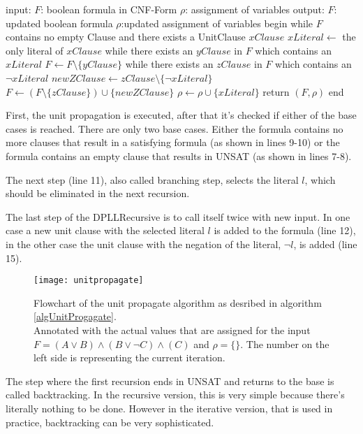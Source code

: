 \begin{algorithm}[caption={UnitPropagate}, label={algUnitProgagate}]
 input: $F$: boolean formula in CNF-Form
	$\rho$: assignment of variables
 output: $F$: updated boolean formula
	$\rho$:updated assignment of variables
 begin
   while $F$ contains no empty Clause
   and there exists a UnitClause $xClause$
       $xLiteral \gets$ the only literal of $xClause$
       while there exists an $yClause$ in $F$
       which contains an $xLiteral$
           $F \gets F \setminus \{yClause\}$     
       while there exists an $zClause$ in $F$
       which contains an $\lnot xLiteral$
           $newZClause \gets zClause \setminus \{\lnot xLiteral\}$
           $F \gets (F \setminus \{zClause\}) \cup \{newZClause\}$
       $\rho \gets \rho \cup \{xLiteral\}$
   return $(F, \rho)$
 end
\end{algorithm}


First, the unit propagation is executed, after that it's checked if either of the base cases is reached. 
There are only two base cases. Either the formula contains no more clauses that result in a satisfying formula (as shown in lines 9-10) or the formula contains an empty clause that results in UNSAT (as shown in lines 7-8).

The next step (line 11), also called branching step, selects the literal $l$, which should be eliminated in the next recursion.

The last step of the DPLLRecursive is to call itself twice with new input. In one case a new unit clause with the selected literal $l$ is added to the formula (line 12), in the other case the unit clause with the negation of the literal, $\lnot l$, is added (line 15).

\begin{figure}
\texttt{[image: unitpropagate]}
\centering
\caption{Flowchart of the unit propagate algorithm as desribed in algorithm \ref{algUnitProgagate}.\\ Annotated with the actual values that are assigned for the input $F=(A \lor B ) \land (B \lor \lnot C) \land (C)$ and $\rho = \{\}$. The number on the left side is representing the current iteration.}
\label{fig:unitpropagate}
\end{figure}

The step where the first recursion ends in UNSAT and returns to the base is called backtracking. In the recursive version, this is very simple because there's literally nothing to be done. However in the iterative version, that is used in practice, backtracking can be very sophisticated.

